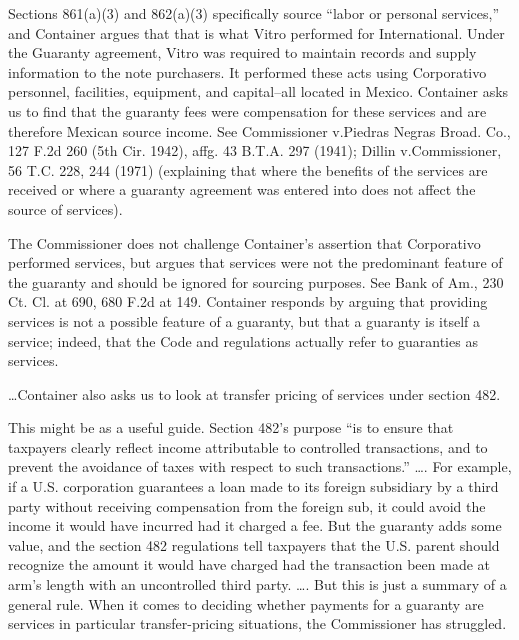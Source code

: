 \begin{select}
Sections 861(a)(3) and 862(a)(3) specifically source ``labor or personal services,'' and Container argues that that is what Vitro performed for International. Under the Guaranty agreement, Vitro was required to maintain records and supply information to the note purchasers. It performed these acts using Corporativo personnel, facilities, equipment, and capital--all located in Mexico. Container asks us to find that the guaranty fees were compensation for these services and are therefore Mexican source income. See Commissioner v.\@ Piedras Negras Broad. Co., 127 F.2d 260 (5th Cir. 1942), affg. 43 B.T.A. 297 (1941); Dillin v.\@ Commissioner, 56 T.C. 228, 244 (1971) (explaining that where the benefits of the services are received or where a guaranty agreement was entered into does not affect the source of services).

The Commissioner does not challenge Container's assertion that Corporativo performed services, but argues that services were not the predominant feature of the guaranty and should be ignored for sourcing purposes. See Bank of Am., 230 Ct. Cl. at 690, 680 F.2d at 149. Container responds by arguing that providing services is not a possible feature of a guaranty, but that a guaranty is itself a service; indeed, that the Code and regulations actually refer to guaranties as services.

\ldots Container also asks us to look at transfer pricing of services under section 482.

This might be as a useful guide. Section 482's purpose ``is to ensure that taxpayers clearly reflect income attributable to controlled transactions, and to prevent the avoidance of taxes with respect to such transactions.'' \ldots. For example, if a U.S. corporation guarantees a loan made to its foreign subsidiary by a third party without receiving compensation from the foreign sub, it could avoid the income it would have incurred had it charged a fee. But the guaranty adds some value, and the section 482 regulations tell taxpayers that the U.S. parent should recognize the amount it would have charged had the transaction been made at arm's length with an uncontrolled third party. \ldots. But this is just a summary of a general rule. When it comes to deciding whether payments for a guaranty are services in particular transfer-pricing situations, the Commissioner has struggled.


\end{select}
